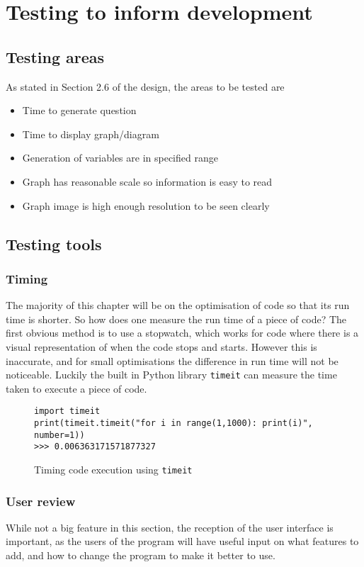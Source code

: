 \chapter{Testing to inform development}
\section{Testing areas}
As stated in Section 2.6 of the design, the areas to be tested are
\begin{itemize}
	\item Time to generate question
	\item Time to display graph/diagram
	\item Generation of variables are in specified range
	\item Graph has reasonable scale so information is easy to read
	\item Graph image is high enough resolution to be seen clearly
\end{itemize}
\section{Testing tools}
\subsection{Timing}
The majority of this chapter will be on the optimisation of code so that its run time is shorter. So how does one measure the run time of a piece of code? The first obvious method is to use a stopwatch, which works for code where there is a visual representation of when the code stops and starts. However this is inaccurate, and for small optimisations the difference in run time will not be noticeable. Luckily the built in Python library \texttt{timeit} can measure the time taken to execute a piece of code.
\begin{figure}[H]
	\texttt{import timeit\\
		print(timeit.timeit("for i in range(1,1000): print(i)", number=1))\\
		>>> 0.006363171571877327}
	\caption{Timing code execution using \texttt{timeit}}
\end{figure}
\subsection{User review}
While not a big feature in this section, the reception of the user interface is important, as the users of the program will have useful input on what features to add, and how to change the program to make it better to use.
